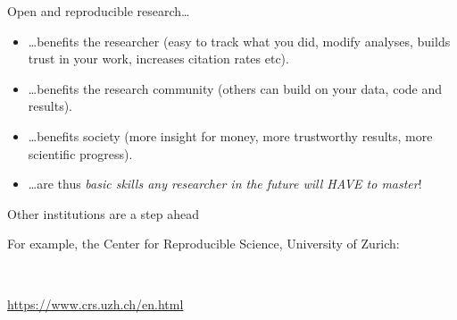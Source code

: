 \documentclass[
  10pt,
  ignorenonframetext,
]{beamer}
\providecommand{\tightlist}{%
  \setlength{\itemsep}{0pt}\setlength{\parskip}{0pt}}
\begin{document}
\begin{frame}{Open and reproducible research\ldots{}}
\protect\hypertarget{open-and-reproducible-research}{}
\(~\)

\begin{itemize}
\tightlist
\item
  \ldots benefits the researcher (easy to track what you did, modify
  analyses, builds trust in your work, increases citation rates etc).
\end{itemize}

\vspace{2mm}

\begin{itemize}
\tightlist
\item
  \ldots benefits the research community (others can build on your data,
  code and results).
\end{itemize}

\vspace{2mm}

\begin{itemize}
\tightlist
\item
  \ldots benefits society (more insight for money, more trustworthy
  results, more scientific progress).
\end{itemize}

\vspace{2mm}

\begin{itemize}
\tightlist
\item
  \ldots are thus \emph{basic skills any researcher in the future will
  HAVE to master}!
\end{itemize}
\end{frame}

\begin{frame}
\begin{block}{Other institutions are a step ahead}
\protect\hypertarget{other-institutions-are-a-step-ahead}{}
\(~\)

For example, the Center for Reproducible Science, University of Zurich:

\(~\)

\url{https://www.crs.uzh.ch/en.html}
\end{block}
\end{frame}
\end{document}
